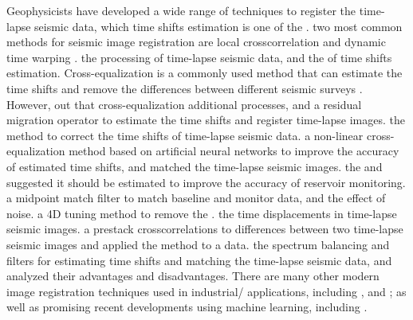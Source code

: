 Geophysicists have developed a wide range of techniques to register the time-lapse seismic data,  which time shifts estimation is one of the   \cite[]{bertrand2008detectability}.  two most common methods for seismic image registration are local crosscorrelation \cite[]{hale2006fast} and dynamic time warping \cite[]{hale2013dynamic}.
\cite{nguyen2015a}  the processing of time-lapse seismic data, and  the  of time shifts estimation.
Cross-equalization is a commonly used method that can estimate the time shifts and remove the differences between different seismic surveys \cite[]{ross1997time-lapse}. 
However, \cite{rickett2001cross}  out that cross-equalization  additional processes, and  a residual migration operator to estimate the time shifts and register time-lapse images.
\cite{huang2001seismic}  the method to correct the time shifts of time-lapse seismic data.
\cite{Alismaili2002Non}  a non-linear cross-equalization method based on artificial neural networks to improve the accuracy of estimated time shifts, and matched the time-lapse seismic images. 
\cite{vasco2004seismic}  the  and suggested  it should be estimated to improve the accuracy of reservoir monitoring.
\cite{gallop2011midpoint}  a midpoint match filter to match baseline and monitor data, and  the effect of noise.  \cite{bertrand2008detectability}  a 4D tuning method to remove the . 
\cite{hale2009a}  the time displacements in time-lapse seismic images. 
\cite{bergmann2014timelapse}  a prestack crosscorrelations to  differences between two time-lapse seismic images and applied the method to a  data. \cite{hatchell2019matching}  the spectrum balancing and   filters for estimating time shifts and matching the time-lapse seismic data, and analyzed their advantages and disadvantages. There are many other modern image registration techniques used in industrial/ applications, including \cite{williamson2007new}, and \cite{phillips2016seismic}; as well as promising recent developments using machine learning, including \cite{dramsch2019deep}.

